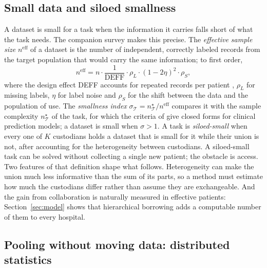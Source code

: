 \documentclass[acmsmall,screen,review]{acmart}
\newcommand{\eff}{\mathrm{eff}}
\theoremstyle{acmdefinition}
\begin{document}
\subsection{Small data and siloed smallness}\label{sec:smallness}

A dataset is small for a task when the information it carries falls short of what the task needs. The companion survey \cite{simoes2026collectively} makes this precise. The \emph{effective sample size} $n^{\eff}$ of a dataset is the number of independent, correctly labeled records from the target population that would carry the same information; to first order,
\begin{equation}\label{eq:neff}
n^{\eff}=n\cdot\frac{1}{\mathrm{DEFF}}\cdot\rho_L\cdot(1-2\eta)^2\cdot\rho_S,
\end{equation}
where the design effect DEFF accounts for repeated records per patient \cite{kish1965survey}, $\rho_L$ for missing labels, $\eta$ for label noise \cite{angluin1988learning} and $\rho_S$ for the shift between the data and the population of use. The \emph{smallness index} $\sigma_{\mathcal{T}}=n^{\star}_{\mathcal{T}}/n^{\eff}$ compares it with the sample complexity $n^{\star}_{\mathcal{T}}$ of the task, for which the criteria of \citet{riley2019minimumsample} give closed forms for clinical prediction models; a dataset is small when $\sigma>1$. A task is \emph{siloed-small} when every one of $K$ custodians holds a dataset that is small for it while their union is not, after accounting for the heterogeneity between custodians. A siloed-small task can be solved without collecting a single new patient; the obstacle is access. Two features of that definition shape what follows. Heterogeneity can make the union much less informative than the sum of its parts, so a method must estimate how much the custodians differ rather than assume they are exchangeable. And the gain from collaboration is naturally measured in effective patients: Section~\ref{sec:model} shows that hierarchical borrowing adds a computable number of them to every hospital.

\subsection{Pooling without moving data: distributed statistics}\label{sec:distributed}
\end{document}
